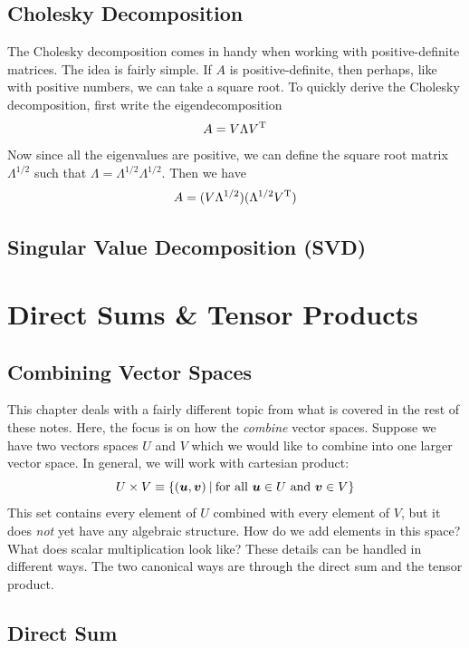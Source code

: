 \documentclass[onecolumn]{gwclass}
\begin{document}
\subsection{Cholesky Decomposition}

The Cholesky decomposition comes in handy when working with positive-definite matrices. The idea is fairly simple. If $A$ is positive-definite, then perhaps, like with positive numbers, we can take a square root. To quickly derive the Cholesky decomposition, first write the eigendecomposition
$$ A = V\Lambda V^{\text{\normalfont{T}}} $$
Now since all the eigenvalues are positive, we can define the square root matrix $\Lambda^{1/2}$ such that $\Lambda = \Lambda^{1/2}\Lambda^{1/2}$. Then we have
$$ A= (V\Lambda^{1/2})(\Lambda^{1/2}V^{\text{\normalfont{T}}}) $$


\subsection{Singular Value Decomposition (SVD)}





\newpage
\section{Direct Sums \& Tensor Products}


\subsection{Combining Vector Spaces}

This chapter deals with a fairly different topic from what is covered in the rest of these notes. Here, the focus is on how the \emph{combine} vector spaces. Suppose we have two vectors spaces $U$ and $V$ which we would like to combine into one larger vector space. In general, we will work with cartesian product:
$$ U\times V \equiv \{ (\boldsymbol{u},\boldsymbol{v})\:|\:\text{\normalfont{for all }} \boldsymbol{u}\in U \text{\normalfont{ and }} \boldsymbol{v}\in V\}$$
This set contains every element of $U$ combined with every element of $V$, but it does \emph{not} yet have any algebraic structure. How do we add elements in this space? What does scalar multiplication look like? These details can be handled in different ways. The two canonical ways are through the direct sum and the tensor product.

\subsection{Direct Sum}
\end{document}
